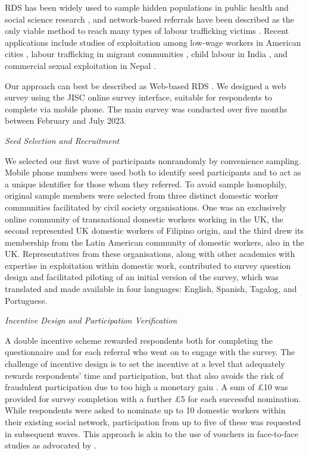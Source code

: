 \documentclass[
  12pt,
  letterpaper,
  DIV=11,
  numbers=noendperiod]{scrartcl}
\begin{document}
RDS has been widely used to sample hidden populations in public health
and social science research
\autocite{mccr12-evaluation,schw12-prevalence}, and network-based
referrals have been described as the only viable method to reach many
types of labour trafficking victims \autocite{zhang_measuring_2012}.
Recent applications include studies of exploitation among low-wage
workers in American cities \autocite{bern09-broken}, labour trafficking
in migrant communities \autocite{vinc17-estimating}, child labour in
India \autocite{zhan19-victims}, and commercial sexual exploitation in
Nepal \autocite{jord20-overcoming}.

Our approach can best be described as Web-based RDS
\autocite{wejn08-webbased}. We designed a web survey using the JISC
online survey interface, suitable for respondents to complete via mobile
phone. The main survey was conducted over five months between February
and July 2023.

\emph{Seed Selection and Recruitment}

We selected our first wave of participants nonrandomly by convenience
sampling. Mobile phone numbers were used both to identify seed
participants and to act as a unique identifier for those whom they
referred. To avoid sample homophily, original sample members were
selected from three distinct domestic worker communities facilitated by
civil society organisations. One was an exclusively online community of
transnational domestic workers working in the UK, the second represented
UK domestic workers of Filipino origin, and the third drew its
membership from the Latin American community of domestic workers, also
in the UK. Representatives from these organisations, along with other
academics with expertise in exploitation within domestic work,
contributed to survey question design and facilitated piloting of an
initial version of the survey, which was translated and made available
in four languages: English, Spanish, Tagalog, and Portuguese.

\emph{Incentive Design and Participation Verification}

A double incentive scheme rewarded respondents both for completing the
questionnaire and for each referral who went on to engage with the
survey. The challenge of incentive design is to set the incentive at a
level that adequately rewards respondents' time and participation, but
that also avoids the risk of fraudulent participation due to too high a
monetary gain \autocite{jord20-overcoming}. A sum of £10 was provided
for survey completion with a further £5 for each successful nomination.
While respondents were asked to nominate up to 10 domestic workers
within their existing social network, participation from up to five of
these was requested in subsequent waves. This approach is akin to the
use of vouchers in face-to-face studies as advocated by
\textcite{thompson_new_2020}.
\end{document}

